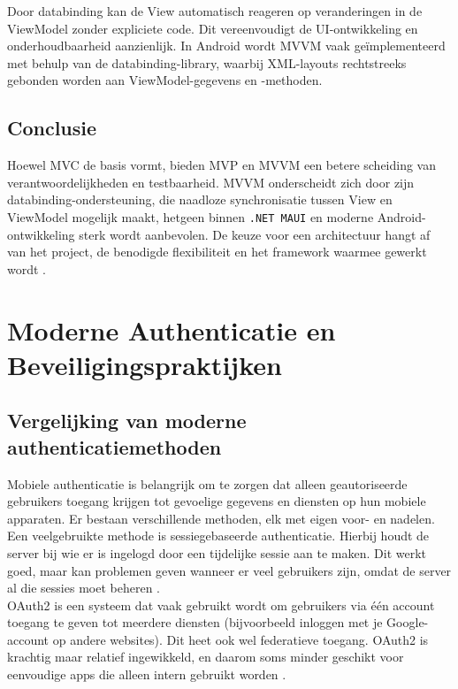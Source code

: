 Door databinding kan de View automatisch reageren op veranderingen in de ViewModel zonder expliciete code. Dit vereenvoudigt de UI-ontwikkeling en onderhoudbaarheid aanzienlijk. In Android wordt MVVM vaak geïmplementeerd met behulp van de databinding-library, waarbij XML-layouts rechtstreeks gebonden worden aan ViewModel-gegevens en -methoden.

\subsection{Conclusie}
Hoewel MVC de basis vormt, bieden MVP en MVVM een betere scheiding van verantwoordelijkheden en testbaarheid. MVVM onderscheidt zich door zijn databinding-ondersteuning, die naadloze synchronisatie tussen View en ViewModel mogelijk maakt, hetgeen binnen \texttt{.NET MAUI} en moderne Android-ontwikkeling sterk wordt aanbevolen. De keuze voor een architectuur hangt af van het project, de benodigde flexibiliteit en het framework waarmee gewerkt wordt \autocite{Lou2016}.


\section{Moderne Authenticatie en Beveiligingspraktijken}

\subsection{Vergelijking van moderne authenticatiemethoden}

Mobiele authenticatie is belangrijk om te zorgen dat alleen geautoriseerde gebruikers toegang krijgen tot gevoelige gegevens en diensten op hun mobiele apparaten. Er bestaan verschillende methoden, elk met eigen voor- en nadelen.\\

Een veelgebruikte methode is sessiegebaseerde authenticatie. Hierbij houdt de server bij wie er is ingelogd door een tijdelijke sessie aan te maken. Dit werkt goed, maar kan problemen geven wanneer er veel gebruikers zijn, omdat de server al die sessies moet beheren \autocite{Gao2023}.\\

OAuth2 is een systeem dat vaak gebruikt wordt om gebruikers via één account toegang te geven tot meerdere diensten (bijvoorbeeld inloggen met je Google-account op andere websites). Dit heet ook wel federatieve toegang. OAuth2 is krachtig maar relatief ingewikkeld, en daarom soms minder geschikt voor eenvoudige apps die alleen intern gebruikt worden \autocite{Gao2023}.\\

